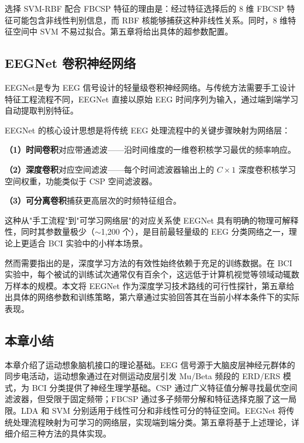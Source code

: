 选择 SVM-RBF 配合 FBCSP 特征的理由是：经过特征选择后的 8 维 FBCSP 特征可能包含非线性判别信息，而 RBF 核能够捕获这种非线性关系。同时，8 维特征空间中 SVM 不易过拟合。第五章将给出具体的超参数配置。

\subsection{EEGNet 卷积神经网络}
\label{sec:eegnet-theory}

EEGNet是专为 EEG 信号设计的轻量级卷积神经网络。与传统方法需要手工设计特征工程流程不同，EEGNet 直接以原始 EEG 时间序列为输入，通过端到端学习自动提取判别特征。

EEGNet 的核心设计思想是将传统 EEG 处理流程中的关键步骤映射为网络层：

\textbf{（1）时间卷积}对应带通滤波——沿时间维度的一维卷积核学习最优的频率响应。

\textbf{（2）深度卷积}对应空间滤波——每个时间滤波器输出上的 $C \times 1$ 深度卷积核学习空间权重，功能类似于 CSP 空间滤波器。

\textbf{（3）可分离卷积}捕获更高层次的时频特征组合。

这种从"手工流程"到"可学习网络层"的对应关系使 EEGNet 具有明确的物理可解释性，同时其参数量极少（$\sim$1,200 个），是目前最轻量级的 EEG 分类网络之一，理论上更适合 BCI 实验中的小样本场景。

然而需要指出的是，深度学习方法的有效性始终依赖于充足的训练数据。在 BCI 实验中，每个被试的训练试次通常仅有百余个，这远低于计算机视觉等领域动辄数万样本的规模。本文将 EEGNet 作为深度学习技术路线的可行性探针，第五章给出具体的网络参数和训练策略，第六章通过实验回答其在当前小样本条件下的实际表现。

\subsection{本章小结}

本章介绍了运动想象脑机接口的理论基础。EEG 信号源于大脑皮层神经元群体的同步电活动，运动想象通过在对侧运动皮层引发 Mu/Beta 频段的 ERD/ERS 模式，为 BCI 分类提供了神经生理学基础。CSP 通过广义特征值分解寻找最优空间滤波器，但受限于固定频带；FBCSP 通过多子频带分解和特征选择克服了这一局限。LDA 和 SVM 分别适用于线性可分和非线性可分的特征空间。EEGNet 将传统处理流程映射为可学习的网络层，实现端到端分类。第五章将基于上述理论，详细介绍三种方法的具体实现。


